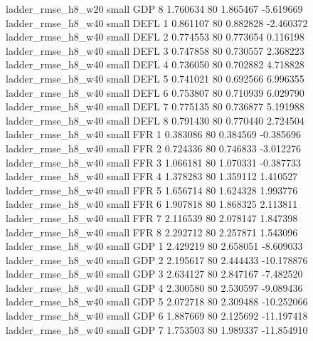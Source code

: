       ladder_rmse_h8_w20      small      GDP                 8 1.760634 80       1.865467          -5.619669
      ladder_rmse_h8_w40      small     DEFL                 1 0.861107 80       0.882828          -2.460372
      ladder_rmse_h8_w40      small     DEFL                 2 0.774553 80       0.773654           0.116198
      ladder_rmse_h8_w40      small     DEFL                 3 0.747858 80       0.730557           2.368223
      ladder_rmse_h8_w40      small     DEFL                 4 0.736050 80       0.702882           4.718828
      ladder_rmse_h8_w40      small     DEFL                 5 0.741021 80       0.692566           6.996355
      ladder_rmse_h8_w40      small     DEFL                 6 0.753807 80       0.710939           6.029790
      ladder_rmse_h8_w40      small     DEFL                 7 0.775135 80       0.736877           5.191988
      ladder_rmse_h8_w40      small     DEFL                 8 0.791430 80       0.770440           2.724504
      ladder_rmse_h8_w40      small      FFR                 1 0.383086 80       0.384569          -0.385696
      ladder_rmse_h8_w40      small      FFR                 2 0.724336 80       0.746833          -3.012276
      ladder_rmse_h8_w40      small      FFR                 3 1.066181 80       1.070331          -0.387733
      ladder_rmse_h8_w40      small      FFR                 4 1.378283 80       1.359112           1.410527
      ladder_rmse_h8_w40      small      FFR                 5 1.656714 80       1.624328           1.993776
      ladder_rmse_h8_w40      small      FFR                 6 1.907818 80       1.868325           2.113811
      ladder_rmse_h8_w40      small      FFR                 7 2.116539 80       2.078147           1.847398
      ladder_rmse_h8_w40      small      FFR                 8 2.292712 80       2.257871           1.543096
      ladder_rmse_h8_w40      small      GDP                 1 2.429219 80       2.658051          -8.609033
      ladder_rmse_h8_w40      small      GDP                 2 2.195617 80       2.444433         -10.178876
      ladder_rmse_h8_w40      small      GDP                 3 2.634127 80       2.847167          -7.482520
      ladder_rmse_h8_w40      small      GDP                 4 2.300580 80       2.530597          -9.089436
      ladder_rmse_h8_w40      small      GDP                 5 2.072718 80       2.309488         -10.252066
      ladder_rmse_h8_w40      small      GDP                 6 1.887669 80       2.125692         -11.197418
      ladder_rmse_h8_w40      small      GDP                 7 1.753503 80       1.989337         -11.854910
